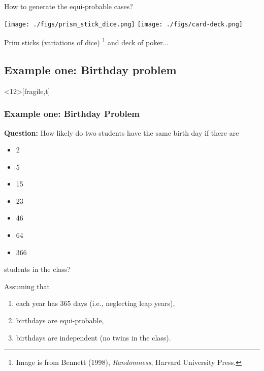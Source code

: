 \documentclass[9pt,xcolor=dvipsnames,table]{beamer}
\begin{document}
\begin{frame}[fragile] %
 \begin{center}
   How to generate the equi-probable cases?
 \end{center}
 \vfill \pause
 \begin{center}
   \texttt{[image: ./figs/prism\_stick\_dice.png]}
   \texttt{[image: ./figs/card-deck.png]}
   \bigskip

   Prim sticks (variations of dice) \footnote{Image is from Bennett (1998), {\it Randomness},
   Harvard University Press.} and deck of poker...
 \end{center}
\end{frame}
\subsection{Example one: Birthday problem}%
\begin{frame}<12>[fragile,t] %
  \frametitle{Example one: Birthday Problem} {\bf Question:} How likely do two students have the same birth day
  if there are
  \begin{itemize}
    \item 2
    \item 5
    \item 15
    \item 23
    \item 46
    \item 64
    \item 366
  \end{itemize}
  students in the class? \vfill \pause

  Assuming that \pause
  \begin{enumerate}
    \item each year has 365 days (i.e., neglecting leap years),
    \item birthdays are equi-probable,
    \item birthdays are independent (no twins in the class).
  \end{enumerate}
\end{frame}
\end{document}
